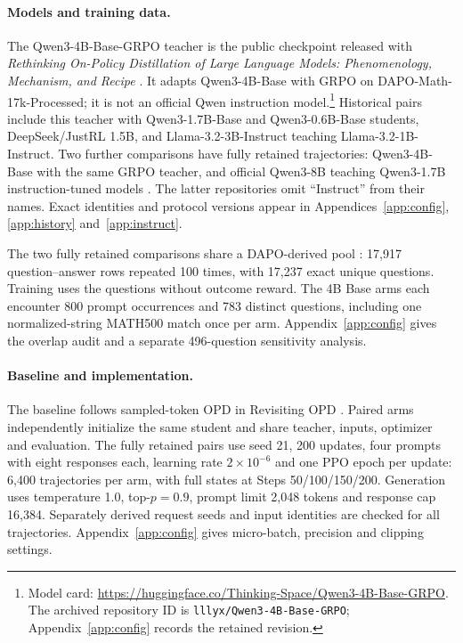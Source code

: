 \paragraph{Models and training data.}
The Qwen3-4B-Base-GRPO teacher is the public checkpoint released with \emph{Rethinking On-Policy Distillation of Large Language Models: Phenomenology, Mechanism, and Recipe} \citep{rethinking}. It adapts Qwen3-4B-Base with GRPO on DAPO-Math-17k-Processed; it is not an official Qwen instruction model.\footnote{Model card: \url{https://huggingface.co/Thinking-Space/Qwen3-4B-Base-GRPO}. The archived repository ID is \texttt{lllyx/Qwen3-4B-Base-GRPO}; Appendix~\ref{app:config} records the retained revision.}
Historical pairs include this teacher with Qwen3-1.7B-Base and Qwen3-0.6B-Base students, DeepSeek/JustRL 1.5B, and Llama-3.2-3B-Instruct teaching Llama-3.2-1B-Instruct. Two further comparisons have fully retained trajectories: Qwen3-4B-Base with the same GRPO teacher, and official Qwen3-8B teaching Qwen3-1.7B instruction-tuned models \citep{qwen3,llama3,llama32}. The latter repositories omit ``Instruct'' from their names. Exact identities and protocol versions appear in Appendices~\ref{app:config}, \ref{app:history} and~\ref{app:instruct}.

The two fully retained comparisons share a DAPO-derived pool \citep{dapo}: 17,917 question--answer rows repeated 100 times, with 17,237 exact unique questions. Training uses the questions without outcome reward. The 4B Base arms each encounter 800 prompt occurrences and 783 distinct questions, including one normalized-string MATH500 match once per arm. Appendix~\ref{app:config} gives the overlap audit and a separate 496-question sensitivity analysis.

\paragraph{Baseline and implementation.}
The baseline follows sampled-token OPD in Revisiting OPD \citep{revisiting}. Paired arms independently initialize the same student and share teacher, inputs, optimizer and evaluation. The fully retained pairs use seed 21, 200 updates, four prompts with eight responses each, learning rate $2\times10^{-6}$ and one PPO epoch per update: 6,400 trajectories per arm, with full states at Steps 50/100/150/200. Generation uses temperature 1.0, top-$p=0.9$, prompt limit 2,048 tokens and response cap 16,384. Separately derived request seeds and input identities are checked for all trajectories. Appendix~\ref{app:config} gives micro-batch, precision and clipping settings.

